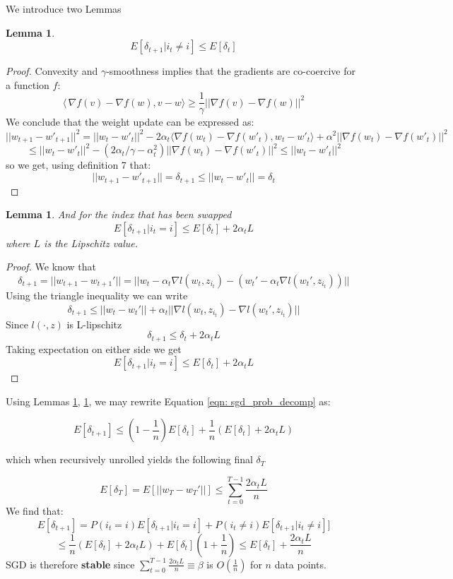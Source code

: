\documentclass{article}
\newtheorem{lemma}[theorem]{Lemma}
\begin{document}
We introduce two Lemmas
\begin{lemma} \label{lem: lem_1}
    \[
    E[\delta_{t+1} | i_t \neq i] \leq E[\delta_t]
    \]
\end{lemma}
\begin{proof}
Convexity and $\gamma$-smoothness implies that the gradients are co-coercive for a  function $f$: 
\[ 
\langle\,\nabla f(v)- \nabla f(w), v-w \rangle \geq \frac{1}{\gamma}||\nabla f(v)- \nabla f(w)||^2
\]
We conclude that the weight update can be expressed as:
    \[ 
    ||w_{t+1}-w'_{t+1}||^2 = ||w_t-w'_t||^2 - 2\alpha_t \langle \nabla f(w_t)- \nabla f(w'_t), w_t-w'_t \rangle +\alpha^2 ||\nabla f(w_t)- \nabla f(w'_t)||^2 \]
    \[
    \leq ||w_t-w'_t||^2 - (2 \alpha_t / \gamma - \alpha_t^2) ||\nabla f(w_t)- \nabla f(w'_t)||^2 \leq ||w_t-w'_t||^2
    \]
so we get, using definition 7 that:
    \[
    ||w_{t+1}-w'_{t+1}|| = \delta_{t+1} \leq ||w_{t}-w'_{t}|| = \delta_{t}
    \]
\end{proof}
\begin{lemma} \label{lem: lem_2} And for the index that has been swapped
    \[
    E[\delta_{t+1} | i_t = i] \leq E[\delta_t] + 2 \alpha_t L
    \]
where $L$ is the Lipschitz value.
\end{lemma}
\begin{proof}
We know that 
    \[\delta_{t+1}=||w_{t+1}-w_{t+1}'||=||w_t-\alpha_t \nabla l(w_t, z_{i_t}) - ( w_t'-\alpha_t \nabla l(w_t', z_{i_t}))||
    \]
Using the triangle inequality we can write
    \[\delta_{t+1} \leq ||w_t - w_t'|| + \alpha_t||\nabla l(w_t,z_{i_t}) - \nabla l(w_t',z_{i_t})||
    \]
Since $l(\cdot, z)$ is L-lipschitz
    \[\delta_{t+1} \leq \delta_t + 2\alpha_t L
    \]
Taking expectation on either side we get
    \[E[\delta_{t+1}|i_t=i] \leq E[\delta_t] + 2\alpha_t L
    \]
\end{proof}

  Using Lemmas \ref{lem: lem_1}, \ref{lem: lem_2}, we may rewrite Equation \ref{eqn: sgd_prob_decomp} as:

\begin{equation}
    E[\delta_{t+1}] \leq \left(1 - \frac{1}{n}\right)E[\delta_t] + \frac{1}{n} \left( E[\delta_t] + 2 \alpha_t L \right)
\end{equation}

which when recursively unrolled yields the following final $\delta_T$

\begin{equation}
    E[\delta_T] = E[|| w_T - w_T' ||] \leq  \sum_{t=0} ^ {T-1}  \frac{ 2 \alpha_t L }{n}
\end{equation}
We find that:
    \[
    E[\delta_{t+1}] = P(i_t=i)E[\delta_{t+1}|i_t=i] + P(i_t \neq i)E[\delta_{t+1}|i_t \neq i]] 
    \]
    \[
    \leq \frac{1}{n}(E[\delta_t] + 2\alpha_t L) + E[\delta_t](1+\frac{1}{n}) \leq E[\delta_t] + \frac{2 \alpha_t L}{n}
    \]
SGD is therefore \textbf{stable} since $\sum_{t=0} ^ {T-1}  \frac{ 2 \alpha_t L }{n} \equiv \beta$ is $O(\frac{1}{n})$ for $n$ data points.






\end{document}
